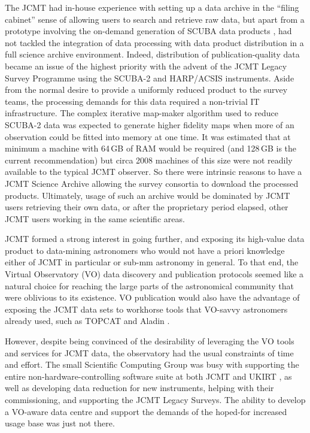 \documentclass[final,authoryear,5p,times,twocolumn]{elsarticle}
\begin{document}
The JCMT had in-house experience with setting up a data archive in the
``filing cabinet'' sense of allowing users to search and retrieve raw
data, but apart from a prototype involving the on-demand generation
of SCUBA data products \citep{2002ASPC..281..243J}, had not tackled
the integration of data processing with data
product distribution in a full science archive environment.
Indeed, distribution of publication-quality data became an issue of
the highest priority with the advent of the JCMT Legacy Survey
Programme \citep{2010HiA....15..797C,2008ASPC..394..450E} using the
SCUBA-2 and HARP/ACSIS \citep{2009MNRAS.399.1026B} instruments. Aside
from the normal desire to provide a uniformly reduced product to the
survey teams, the processing demands for this data required a
non-trivial IT infrastructure.
The complex iterative map-maker algorithm used to reduce SCUBA-2 data
\citep[SMURF;][]{2013MNRAS.430.2545C} was expected to
generate higher fidelity maps when more of an observation could be
fitted into memory at one time. It was estimated that at minimum a
machine with 64\,GB of RAM would be required (and 128\,GB is the
current recommendation) but circa 2008 machines of this size were not readily
available to the typical JCMT observer.
So there were intrinsic
reasons to have a JCMT Science Archive allowing the survey consortia
to download the processed products. Ultimately, usage of such an
archive would be dominated by JCMT users retrieving their own data, or
after the proprietary period elapsed, other JCMT users working in the
same scientific areas.

JCMT formed a strong interest in going further, and exposing its
high-value data product to data-mining astronomers who would not have
a priori knowledge either of JCMT in particular or sub-mm astronomy in
general. To that end, the Virtual Observatory (VO) data discovery and publication protocols
seemed like a natural choice for reaching the large parts of the
astronomical community that were oblivious to its existence. VO
publication would also have the advantage of exposing the JCMT data
sets to workhorse tools that VO-savvy astronomers already used, such
as TOPCAT \citep[][]{2005ASPC..347...29T} and Aladin
\citep[][]{2005ASPC..347..193O}.

However, despite being convinced of the desirability of
leveraging the VO tools and services for JCMT data, the observatory
had the usual constraints of time and effort. The small Scientific
Computing Group was busy with supporting the entire non-hardware-controlling
software suite at both JCMT and UKIRT \citep[see e.g.,][with both
telescopes operated by the same organization]{2002SPIE.4844..321E,2011tfa..confE..42J},
as well as developing data reduction for new instruments, helping with
their commissioning,
and supporting the JCMT Legacy Surveys. The ability to develop a
VO-aware data centre and support the demands of the hoped-for
increased usage base was just not there.
\end{document}
